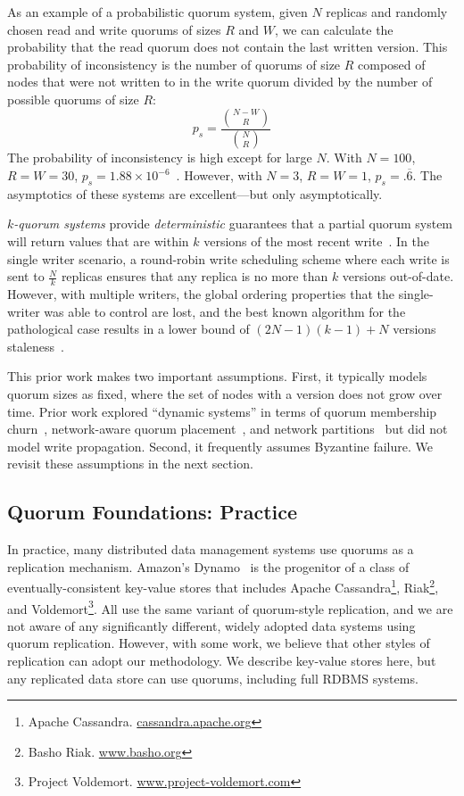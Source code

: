 \documentclass{vldb}
\newcommand{\subsectionskip}{-0em}
\begin{document}
As an example of a probabilistic quorum system, given $N$ replicas and
randomly chosen read and write quorums of sizes $R$ and $W$, we can
calculate the probability that the read quorum does not contain the
last written version.  This probability of inconsistency is the number
of quorums of size $R$ composed of nodes that were not written to in
the write quorum divided by the number of possible quorums of size
$R$:
\begin{equation}
\label{eq:prob-strict}
p_{s}=\frac{{N-W \choose R}}{{N \choose R}}
\end{equation}
The probability of inconsistency is high except for large $N$.  With
$N=100$, $R=W=30$, $p_{s} = 1.88 \times
10^{-6}$~\cite{non-strict}.  However, with $N=3$, $R=W=1$, $p_{s}
= .\overline{6}$.  The asymptotics of these systems are
excellent---but only asymptotically.

\textit{$k$-quorum systems} provide \textit{deterministic} guarantees
that a partial quorum system will return values that are within $k$
versions of the most recent write~\cite{non-strict}.  In the
single writer scenario, a round-robin write scheduling scheme where
each write is sent to $\frac{N}{k}$ replicas ensures that any replica
is no more than $k$ versions out-of-date.  However, with multiple
writers, the global ordering properties that the single-writer was
able to control are lost, and the best known algorithm for the
pathological case results in a lower bound of $(2N-1)(k-1)+N$ versions
staleness~\cite{multi-k-quorum}.

This prior work makes two important assumptions. First, it typically
models quorum sizes as fixed, where the set of nodes with a version
does not grow over time.  Prior work explored ``dynamic systems'' in
terms of quorum membership churn~\cite{prob-quorum-dynamic},
network-aware quorum placement~\cite{delay-quorum, quorum-placement},
and network partitions~\cite{partitionedquorum} but did not model
write propagation. Second, it frequently assumes Byzantine failure.
We revisit these assumptions in the next section.

\vspace{\subsectionskip}\subsection{Quorum Foundations: Practice}
\label{sec:practice}

In practice, many distributed data management systems use quorums as a
replication mechanism. Amazon's Dynamo~\cite{dynamo} is the progenitor
of a class of eventually-consistent key-value stores that includes
Apache Cassandra\footnote{Apache Cassandra.
  \url{cassandra.apache.org}}, Riak\footnote{Basho Riak.
  \url{www.basho.org}}, and Voldemort\footnote{Project Voldemort.
  \url{www.project-voldemort.com}}.  All use the same variant of
quorum-style replication, and we are not aware of any significantly
different, widely adopted data systems using quorum replication.
However, with some work, we believe that other styles of replication
can adopt our methodology.  We describe key-value stores here, but any
replicated data store can use quorums, including full RDBMS systems.
\end{document}
